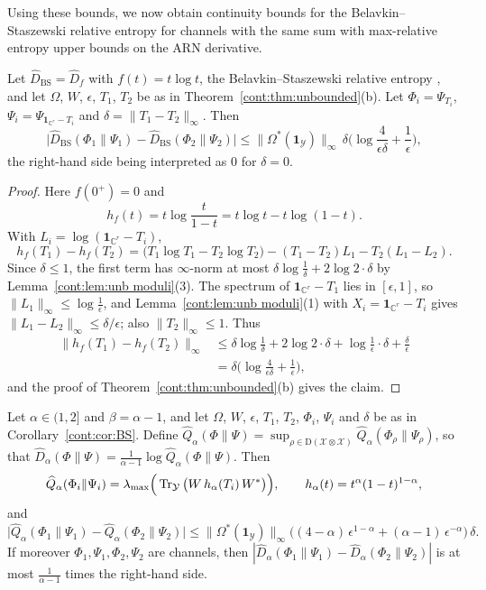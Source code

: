 Using these bounds, we now obtain continuity bounds for the Belavkin--Staszewski relative entropy for channels with the same sum with max-relative entropy upper bounds on the ARN derivative.
\begin{corollary}\label{cont:cor:BS}
Let $\widehat{D}_{\mathrm{BS}}=\widehat{D}_f$ with $f(t)=t\log t$, the Belavkin--Staszewski relative entropy \cite{BelavkinStaszewski1982}, and let $\Omega$, $W$, $\epsilon$, $T_1$, $T_2$ be as in Theorem~\ref{cont:thm:unbounded}(b). Let $\Phi_i=\Psi_{T_i}$, $\Psi_i=\Psi_{\mathbf{1}_{\mathbb{C}^r}-T_i}$ and $\delta=\|T_1-T_2\|_\infty$. Then
\[
\big|\widehat{D}_{\mathrm{BS}}(\Phi_1\|\Psi_1)-\widehat{D}_{\mathrm{BS}}(\Phi_2\|\Psi_2)\big|\leq\|\Omega^*(\mathbf{1}_{\mathcal{Y}})\|_\infty\,\delta\Big(\log\frac{4}{\epsilon\delta}+\frac1\epsilon\Big),
\]
the right-hand side being interpreted as $0$ for $\delta=0$.
\end{corollary}

\begin{proof}
Here $f(0^+)=0$ and
\[
h_f(t)=t\log\frac{t}{1-t}=t\log t-t\log(1-t).
\]
With $L_i=\log(\mathbf{1}_{\mathbb{C}^r}-T_i)$,
\[
h_f(T_1)-h_f(T_2)=\big(T_1\log T_1-T_2\log T_2\big)-(T_1-T_2)L_1-T_2(L_1-L_2).
\]
Since $\delta\leq1$, the first term has $\infty$-norm at most $\delta\log\frac1\delta+2\log2\cdot\delta$ by Lemma~\ref{cont:lem:unb moduli}(3). The spectrum of $\mathbf{1}_{\mathbb{C}^r}-T_1$ lies in $[\epsilon,1]$, so $\|L_1\|_\infty\leq\log\frac1\epsilon$, and Lemma~\ref{cont:lem:unb moduli}(1) with $X_i=\mathbf{1}_{\mathbb{C}^r}-T_i$ gives $\|L_1-L_2\|_\infty\leq\delta/\epsilon$; also $\|T_2\|_\infty\leq1$. Thus
\begin{align*}
\|h_f(T_1)-h_f(T_2)\|_\infty&\leq\delta\log\frac1\delta+2\log2\cdot\delta+\log\frac1\epsilon\cdot\delta+\frac{\delta}{\epsilon}\\
&=\delta\Big(\log\frac{4}{\epsilon\delta}+\frac1\epsilon\Big),
\end{align*}
and the proof of Theorem~\ref{cont:thm:unbounded}(b) gives the claim.
\end{proof}

\begin{corollary}\label{cont:cor:renyi large alpha}
Let $\alpha\in(1,2]$ and $\beta=\alpha-1$, and let $\Omega$, $W$, $\epsilon$, $T_1$, $T_2$, $\Phi_i$, $\Psi_i$ and $\delta$ be as in Corollary~\ref{cont:cor:BS}. Define $\widehat{Q}_\alpha(\Phi\|\Psi)=\sup_{\rho\in\mathrm{D}(\mathcal{X}\otimes\mathcal{X})}\widehat{Q}_\alpha(\Phi_\rho\|\Psi_\rho)$, so that $\widehat{D}_\alpha(\Phi\|\Psi)=\frac{1}{\alpha-1}\log\widehat{Q}_\alpha(\Phi\|\Psi)$. Then
\[
\widehat{Q}_\alpha(\Phi_i\|\Psi_i)=\lambda_{\max}\Big(\operatorname{Tr}_{\mathcal{Y}}\big(W\,h_\alpha(T_i)\,W^*\big)\Big),\qquad h_\alpha(t)=t^\alpha(1-t)^{1-\alpha},
\]
and
\[
\big|\widehat{Q}_\alpha(\Phi_1\|\Psi_1)-\widehat{Q}_\alpha(\Phi_2\|\Psi_2)\big|\leq\|\Omega^*(\mathbf{1}_{\mathcal{Y}})\|_\infty\Big((4-\alpha)\,\epsilon^{1-\alpha}+(\alpha-1)\,\epsilon^{-\alpha}\Big)\,\delta .
\]
If moreover $\Phi_1,\Psi_1,\Phi_2,\Psi_2$ are channels, then $|\widehat{D}_\alpha(\Phi_1\|\Psi_1)-\widehat{D}_\alpha(\Phi_2\|\Psi_2)|$ is at most $\frac{1}{\alpha-1}$ times the right-hand side.
\end{corollary}

